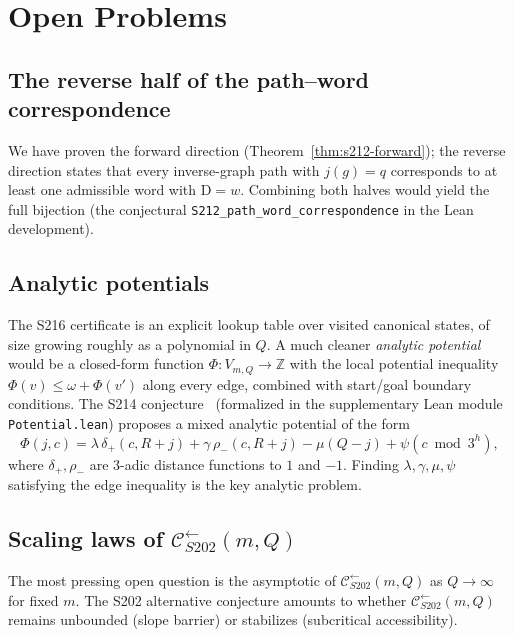 \documentclass[11pt,a4paper]{article}
\theoremstyle{plain}
\theoremstyle{definition}
\theoremstyle{plain}
\newcommand{\ZZ}{\mathbb{Z}}
\newcommand{\Calphax}{\mathcal{C}^{\leftarrow}_{S202}}
\newcommand{\defect}{\mathrm{D}}
\begin{document}
\section{Open Problems}\label{sec:open}

\subsection*{The reverse half of the path--word correspondence}
We have proven the forward direction
(Theorem~\ref{thm:s212-forward}); the reverse direction states that
every inverse-graph path with $j(g) = q$ corresponds to at least one
admissible word with $\defect = w$. Combining both halves would yield
the full bijection (the conjectural \texttt{S212\_path\_word\_correspondence}
in the Lean development).

\subsection*{Analytic potentials}
The S216 certificate is an explicit lookup table over visited
canonical states, of size growing roughly as a polynomial in $Q$. A
much cleaner \emph{analytic potential} would be a closed-form
function $\Phi : V_{m,Q} \to \ZZ$ with the local potential
inequality
$\Phi(v) \le \omega + \Phi(v')$ along every edge,
combined with start/goal boundary conditions. The S214
conjecture~\cite{S214} (formalized in the supplementary Lean module
\texttt{Potential.lean}) proposes a mixed analytic potential of the form
\[
  \Phi(j, c) = \lambda\,\delta_+(c, R+j)
             + \gamma\,\rho_-(c, R+j)
             - \mu(Q - j)
             + \psi(c \bmod 3^h),
\]
where $\delta_+,\rho_-$ are 3-adic distance functions to $1$ and $-1$.
Finding $\lambda,\gamma,\mu,\psi$ satisfying the edge inequality is
the key analytic problem.

\subsection*{Scaling laws of $\Calphax(m, Q)$}
The most pressing open question is the asymptotic of
$\Calphax(m, Q)$ as $Q \to \infty$ for fixed $m$. The S202
alternative conjecture amounts to whether $\Calphax(m, Q)$ remains
unbounded (slope barrier) or stabilizes (subcritical accessibility).


\end{document}
